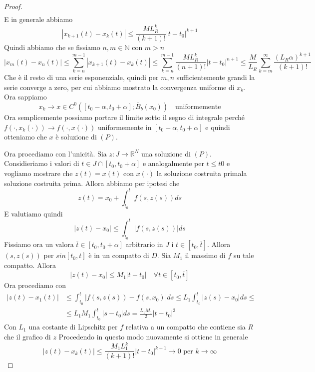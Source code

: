 \begin{proof}
\begin{align*}
    \end{align*}
    E in generale abbiamo 
    \[
        |x_{k+1}(t) - x_{k}(t)| \le \frac{ML_R^{k}}{(k+1)!} |t - t_{0}|^{k+1}
    \]
    Quindi abbiamo che se fissiamo \(n, m \in \mathbb{N}\) con \(m > n\) 
    \[
        |x_{m}(t) - x_{n}(t)| \le \sum_{k=n}^{m-1} |x_{k+1}(t) - x_{k}(t)| \le 
        \sum_{k=n}^{m-1} \frac{ML_R^{k}}{(n+1)!} |t - t_{0}|^{n+1} \le
        \frac{M}{L_R}
    \sum_{k=m}^{\infty} \frac{{(L_R \alpha)}^{k+1}}{(k+1)!}
    \]
    Che è il resto di una serie esponenziale, quindi per \(m, n\)
    sufficientemente grandi la serie converge a zero, per cui abbiamo mostrato
    la convergenza uniforme di \(x_{k}\). Ora sappiamo 
    \[
        x_k \longrightarrow x \in C^{0}([t_{0} - \alpha, t_{0} + \alpha];
        \overline{B}_b(x_{0})) \quad \text{uniformemente}
    \]
    Ora semplicemente possiamo portare il limite sotto il segno di integrale
    perché \(f(\cdot, x_k(\cdot )) \to f(\cdot, x(\cdot ))\) uniformemente in
    \([t_{0}-\alpha, t_{0}+\alpha]\) e
    quindi otteniamo che \(x\) è soluzione di \((P)\).

    Ora procediamo con l'unicità. Sia \(z : J \to \mathbb{R}^{N}\) una soluzione
    di \((P)\). Considieriamo i valori di \(t \in J \cap [t_{0}, t_{0} +
    \alpha]\) e analogalmente per \(t \le  t0\) e vogliamo mostrare che \(z(t) =
    x(t)\) con \(x(\cdot )\) la soluzione costruita primala soluzione costruita
    prima. Allora abbiamo per ipotesi che
    \[
        z(t) = x_{0} + \int_{t_{0}}^{t} f(s, z(s)) ds
    \]
    E valutiamo quindi
    \[
        |z(t) - x_{0}| \le \int_{t_{0}}^{t} |f(s, z(s))| ds
    \]
    Fissiamo ora un valora \(\overline{t} \in [t_{0}, t_{0}+ \alpha]\)
    arbitrario in \(J\) i \(t \in [t_{0}, \overline{t}]\). Allora \((s, z(s))\)
    per \(s in [t_{0}, t]\) è in un compatto di \(D\). Sia \(M_{1}\) il massimo di
    \(f\) su tale compatto. Allora 
    \[
        |z(t) - x_{0}| \le M_{1} |t - t_{0}| \quad \forall t \in [t_{0},
        \overline{t}]
    \]
    Ora procediamo con 
    \begin{align*}
        |z(t) - x_{1}(t)| &\le \int_{t_{0}}^{t} |f(s, z(s)) - f(s, x_{0})| ds \le
        L_{1} \int_{t_{0}}^{t} |z(s) - x_{0}| ds \le \\ &\le  L_{1} M_{1}
        \int_{t_{0}}^{t} |s - t_{0}| ds = \frac{L_{1}M_{1}}{2} |t - t_{0}|^2
    \end{align*}
    Con \(L_{1}\) una costante di Lipschitz per \(f\) relativa a un compatto che
    contiene sia \(R\) che il grafico di \(z\) 
    Procedendo in questo modo nuovamente si ottiene in generale
    \[
        |z(t) - x_{k}(t)| \le \frac{M_{1}L_{1}^{k}}{(k+1)!} |t - t_{0}|^{k+1}
        \longrightarrow 0 \text{ per \(k \to \infty\)}
    \]
\end{proof}
